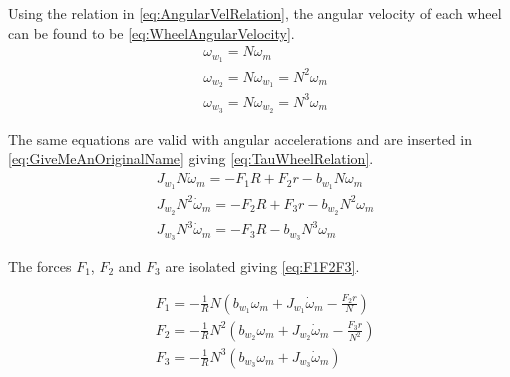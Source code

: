 Using the relation in \autoref{eq:AngularVelRelation}, the angular velocity of each wheel can be found to be \autoref{eq:WheelAngularVelocity}.
\begin{subequations} \label{eq:WheelAngularVelocity}
	\begin{flalign}
		&\omega_{w_1} = N \omega_m \\
		&\omega_{w_2} = N \omega_{w_1} = N^2 \omega_m \\
		&\omega_{w_3} = N \omega_{w_2} = N^3 \omega_m 
	\end{flalign}
\end{subequations}

The same equations are valid with angular accelerations and are inserted in \autoref{eq:GiveMeAnOriginalName} giving \autoref{eq:TauWheelRelation}.
\begin{subequations} \label{eq:TauWheelRelation}
	\begin{flalign}  
		&J_{w_1}N\dot{\omega}_m = -F_1R + F_2r -b_{w_1}N\omega_m \\ 
		&J_{w_2}N^2\dot{\omega}_m = -F_2R + F_3r -b_{w_2}N^2\omega_m  \\ 
		&J_{w_3}N^3\dot{\omega}_m = -F_3R - b_{w_3}N^3\omega_m  
	\end{flalign}
\end{subequations}

%

The forces $F_1$, $F_2$ and $F_3$ are isolated giving \autoref{eq:F1F2F3}.

\begin{subequations} \label{eq:F1F2F3}
	\begin{flalign}
		&F_1 = -\frac{1}{R} N\left(b_{w_1}\omega_m + J_{w_1}\dot{\omega}_m - \frac{F_2r}{N}\right) \label{eq:F1} \\ 
		&F_2 = -\frac{1}{R} N^2\left(b_{w_2}\omega_m + J_{w_2}\dot{\omega}_m - \frac{F_3r}{N^2}\right) \label{eq:F2} \\
		&F_3 = -\frac{1}{R} N^3\left(b_{w_3}\omega_m + J_{w_3}\dot{\omega}_m\right) \label{eq:F3}
	\end{flalign}
\end{subequations}


